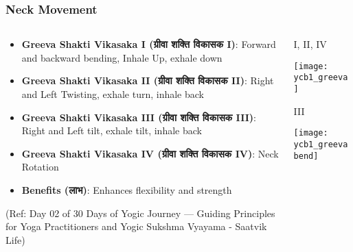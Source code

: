 \begin{frame}[fragile]\frametitle{Neck Movement}
\begin{columns}
    \begin{column}[T]{0.5\linewidth}
      \begin{itemize}
		\item \textbf{Greeva Shakti Vikasaka I (ग्रीवा शक्ति विकासक I)}: Forward and backward bending, Inhale Up, exhale down
		\item \textbf{Greeva Shakti Vikasaka II (ग्रीवा शक्ति विकासक II)}: Right and Left Twisting, exhale turn, inhale back
		\item \textbf{Greeva Shakti Vikasaka III (ग्रीवा शक्ति विकासक III)}: Right and Left tilt, exhale tilt, inhale back
		\item \textbf{Greeva Shakti Vikasaka IV (ग्रीवा शक्ति विकासक IV)}: Neck Rotation
		\item \textbf{Benefits (लाभ)}: Enhances flexibility and strength
	  \end{itemize}
	  
				{\tiny (Ref: Day 02 of 30 Days of Yogic Journey — Guiding Principles for Yoga Practitioners and Yogic Sukshma Vyayama - Saatvik Life)}		  
    \end{column}
    \begin{column}[T]{0.5\linewidth}
		\begin{center}
		I, II, IV
		
		        \texttt{[image: ycb1\_greeva]}
				
				
		III
		
				\texttt{[image: ycb1\_greevabend]}

	
		\end{center}	
    \end{column}
\end{columns}

\end{frame}


